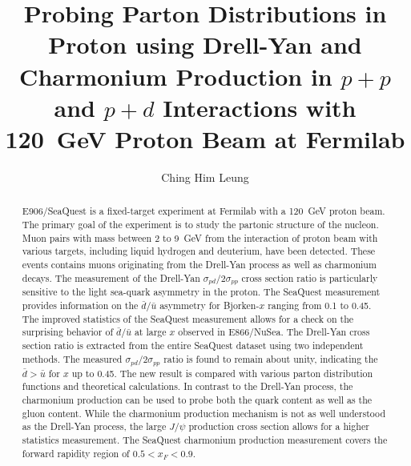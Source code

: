 \documentclass[final]{uiucthesis2021}
\begin{document}
\title{Probing Parton Distributions in Proton using Drell-Yan and Charmonium Production
	in \texorpdfstring{$p+p$}{p+p} and \texorpdfstring{$p+d$}{p+d} Interactions with
	\texorpdfstring{\SI{120}{\GeV}}{120~GeV} Proton Beam at Fermilab}
\author{Ching Him Leung}

\phdthesis
{}
\maketitle
\frontmatter

\begin{abstract}
	E906/SeaQuest is a fixed-target experiment at Fermilab with a \SI{120}{\GeV} proton beam.
	The primary goal of the experiment is to study the partonic structure of the nucleon.
	Muon pairs with mass between \num{2} to \SI{9}{\GeV} from the
	interaction of proton beam with various targets,
	including liquid hydrogen and deuterium, have been detected.
	These events contains muons originating from the Drell-Yan process as well as charmonium decays.
	The measurement of the Drell-Yan $\sigma_{pd}/2\sigma_{pp}$ cross section
	ratio is particularly sensitive to the light sea-quark asymmetry in the proton.
	The SeaQuest measurement provides information on the $\bar{d}/\bar{u}$ asymmetry
	for  Bjorken-$x$ ranging from \num{0.1} to \num{0.45}.
	The improved statistics	of the SeaQuest measurement allows for a check on the surprising behavior of
	$\bar{d}/\bar{u}$ at large $x$ observed in E866/NuSea.
	The Drell-Yan cross section ratio is extracted from the entire SeaQuest dataset
	using two independent methods.
	The measured $\sigma_{pd}/2\sigma_{pp}$ ratio is found to remain about unity,
	indicating the $\bar{d}>\bar{u}$ for $x$ up to \num{0.45}.
	The new result is compared with various parton distribution functions and theoretical calculations.
	In contrast to the Drell-Yan process, the charmonium production can be used to probe both the quark
	content as well as the gluon content.
	While the charmonium production mechanism is not as well understood as the Drell-Yan process,
	the large $J/\psi$ production cross section allows for a higher statistics measurement.
	The SeaQuest charmonium production measurement covers the forward rapidity region of $0.5 < x_F <0.9$.

\end{abstract}
\end{document}
